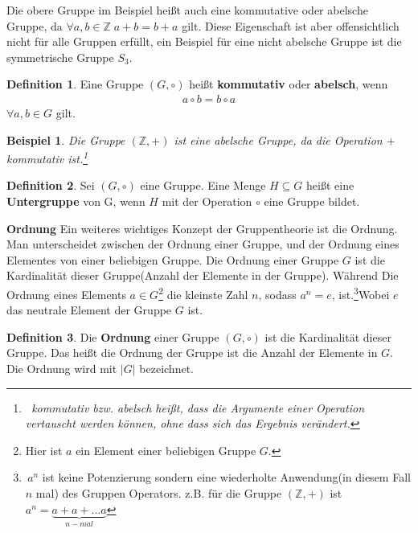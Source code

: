 \documentclass[12pt,oneside]{article}
\newtheorem{example}[theorem]{Beispiel}
\theoremstyle{remark}
\theoremstyle{definition}
\newtheorem{definition}{Definition}[section]
\begin{document}
Die obere Gruppe im Beispiel heißt auch eine kommutative oder abelsche Gruppe, da $\forall a,b \in \mathbb{Z} \; a + b = b + a $ gilt. Diese Eigenschaft ist aber offensichtlich nicht für alle Gruppen erfüllt, ein Beispiel für eine nicht abelsche Gruppe ist die symmetrische Gruppe $S_3$\cite{s3}.

\begin{definition}
Eine Gruppe $(G,\circ)$ heißt \textbf{kommutativ} oder \textbf{abelsch}, wenn
\begin{align*}
    a \circ b = b \circ a  
\end{align*}
$\forall a,b \in G$ gilt.
\end{definition}

\smallskip

\begin{example}
Die Gruppe $(\mathbb{Z},+)$ ist eine abelsche Gruppe, da die Operation $+$ kommutativ ist.\footnote{$\,$ kommutativ bzw. abelsch heißt, dass die Argumente einer Operation vertauscht werden können, ohne dass sich das Ergebnis verändert.}
\end{example}

\smallskip

\begin{definition}
Sei $(G,\circ)$ eine Gruppe. Eine Menge $H \subseteq G$ heißt eine \textbf{Untergruppe} von G, wenn $H$ mit der Operation $\circ$ eine Gruppe bildet.
\end{definition}

\smallskip

\textbf{Ordnung}\newline
Ein weiteres wichtiges Konzept der Gruppentheorie ist die Ordnung. Man unterscheidet zwischen der Ordnung einer Gruppe, und der Ordnung eines Elementes von einer beliebigen Gruppe. Die Ordnung einer Gruppe $G$ ist die Kardinalität dieser Gruppe(Anzahl der Elemente in der Gruppe). Während Die Ordnung eines Elements $a \in G$\footnote{Hier ist $a$ ein Element einer beliebigen Gruppe $G$.} die kleinste Zahl $n$, sodass $a^n =e$, ist.\footnote{$\, a^n$ ist keine Potenzierung sondern eine wiederholte Anwendung(in diesem Fall $n$ mal) des Gruppen Operators. z.B. für die Gruppe $(\mathbb{Z},+)$ ist $a^n = \underbrace{a + a + \dots a}_{n-mal}$}Wobei $e$ das neutrale Element der Gruppe $G$ ist.  




\begin{definition}
Die \textbf{Ordnung} einer Gruppe $(G, \circ)$ ist die Kardinalität dieser Gruppe. Das heißt die Ordnung der Gruppe ist die Anzahl der Elemente in $G$. Die Ordnung wird mit $|G|$ bezeichnet. 
\end{definition}
\end{document}
